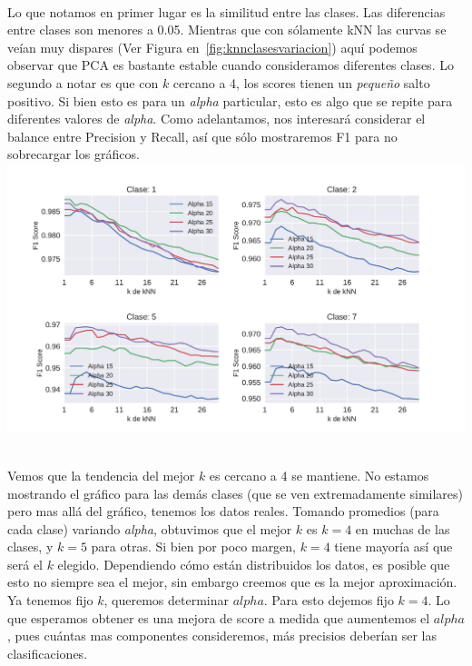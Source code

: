 $ $\newline


Lo que notamos en primer lugar es la similitud entre las clases. Las diferencias entre clases son menores a 0.05. Mientras que con sólamente kNN las curvas se veían muy dispares (Ver Figura en~\ref{fig:knnclasesvariacion}) aquí podemos observar que PCA es bastante estable cuando consideramos diferentes clases. Lo segundo a notar es que con $k$ cercano a 4, los scores tienen un \textit{pequeño} salto positivo. Si bien esto es para un \textit{alpha} particular, esto es algo que se repite para diferentes valores de \textit{alpha}. Como adelantamos, nos interesará considerar el balance entre Precision y Recall, así que sólo mostraremos F1 para no sobrecargar los gráficos. \\

{\centering
    \includegraphics[scale=0.65]{informe/imagenes/pca/variacionKClases1257REENTREGA.pdf} \\
}
$ $\newline

Vemos que la tendencia del mejor $k$ es cercano a 4 se mantiene. No estamos mostrando el gráfico para las demás clases (que se ven extremadamente similares) pero mas allá del gráfico, tenemos los datos reales. Tomando promedios (para cada clase) variando \textit{alpha}, obtuvimos que el mejor $k$ es $k=4$ en muchas de las clases, y $k=5$ para otras. Si bien por poco margen, $k=4$ tiene mayoría así que será el $k$ elegido. Dependiendo cómo están distribuidos los datos, es posible que esto no siempre sea el mejor, sin embargo creemos que es la mejor aproximación. \\

Ya tenemos fijo $k$, queremos determinar $alpha$. Para esto dejemos fijo $k=4$. Lo que esperamos obtener es una mejora de score a medida que aumentemos el $alpha$, pues cuántas mas componentes consideremos, más precisios deberían ser las clasificaciones. \\

